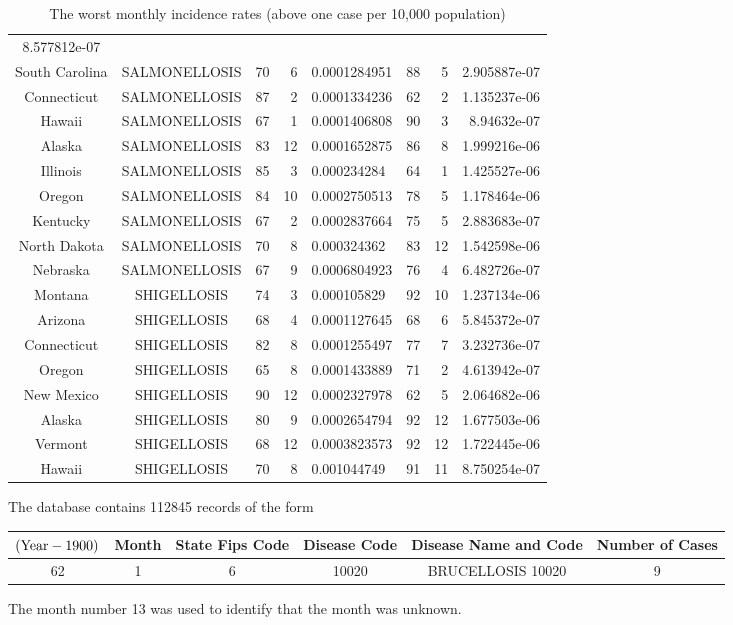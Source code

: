 {\begin{table}
\begin{tabular}{|c|c|c|r|l|c|r|r|}
    8.577812e-07\\ South Carolina & SALMONELLOSIS & 70 & 6 &
    0.0001284951 & 88 & 5 & 2.905887e-07\\ Connecticut &
    SALMONELLOSIS & 87 & 2 & 0.0001334236 & 62 & 2 & 1.135237e-06\\ 
    Hawaii & SALMONELLOSIS & 67 & 1 & 0.0001406808 & 90 & 3 &
    8.94632e-07 \\ Alaska & SALMONELLOSIS & 83 & 12 & 0.0001652875 &
    86 & 8 & 1.999216e-06\\ Illinois & SALMONELLOSIS & 85 & 3 &
    0.000234284 & 64 & 1 & 1.425527e-06\\ Oregon & SALMONELLOSIS &
    84 & 10 & 0.0002750513 & 78 & 5 & 1.178464e-06\\ Kentucky &
    SALMONELLOSIS & 67 & 2 & 0.0002837664 & 75 & 5 & 2.883683e-07\\ 
    North Dakota & SALMONELLOSIS & 70 & 8 & 0.000324362 & 83 & 12 &
    1.542598e-06\\ Nebraska & SALMONELLOSIS & 67 & 9 & 0.0006804923
    & 76 & 4 & 6.482726e-07\\\hline Montana & SHIGELLOSIS & 74 & 3 &
    0.000105829 & 92 & 10 & 1.237134e-06\\ Arizona & SHIGELLOSIS &
    68 & 4 & 0.0001127645 & 68 & 6 & 5.845372e-07\\ Connecticut &
    SHIGELLOSIS & 82 & 8 & 0.0001255497 & 77 & 7 & 3.232736e-07\\ 
    Oregon & SHIGELLOSIS & 65 & 8 & 0.0001433889 & 71 & 2 &
    4.613942e-07\\ New Mexico & SHIGELLOSIS & 90 & 12 & 0.0002327978
    & 62 & 5 & 2.064682e-06\\ Alaska & SHIGELLOSIS & 80 & 9 &
    0.0002654794 & 92 & 12 & 1.677503e-06\\ Vermont & SHIGELLOSIS &
    68 & 12 & 0.0003823573 & 92 & 12 & 1.722445e-06\\ Hawaii &
    SHIGELLOSIS & 70 & 8 & 0.001044749 & 91 & 11 &
    8.750254e-07\\\hline
\end{tabular}
\protect\caption{The worst monthly incidence rates (above one case
  per 10,000 population)}\label{worst}
\end{table}                                                                               
}


The database contains 112845 records of the form

{\scriptsize \vspace{5 pt}
\begin{tabular}{|c|c|c|c|c|c|}
  \hline $({\rm Year} - 1900)$ & Month & State Fips Code & Disease
  Code & Disease Name and Code & Number of Cases \\ \hline 62 & 1 &
  6 & 10020& BRUCELLOSIS 10020 & 9 \\\hline
\end{tabular}
\vspace{5 pt} } The month number 13 was used to identify that the
month was unknown.


